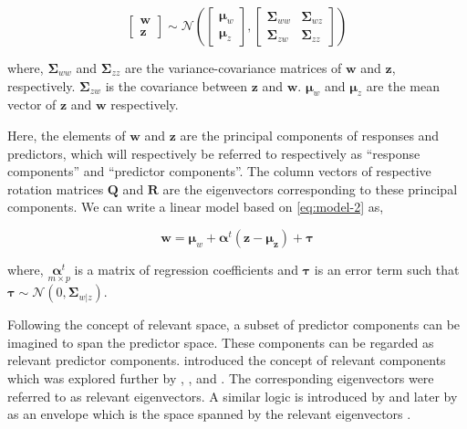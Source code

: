 \documentclass[review]{elsarticle}
\begin{document}
\begin{equation}
  \begin{bmatrix}
    \mathbf{w} \\ \mathbf{z}
  \end{bmatrix} \sim \mathcal{N}
  \left(
    \begin{bmatrix}
      \boldsymbol{\mu}_w \\
      \boldsymbol{\mu}_z
    \end{bmatrix},
    \begin{bmatrix}
    \boldsymbol{\Sigma}_{ww} & \boldsymbol{\Sigma}_{wz} \\
    \boldsymbol{\Sigma}_{zw} & \boldsymbol{\Sigma}_{zz}
    \end{bmatrix}
  \right)
  \label{eq:model-2}
\end{equation}

where, \(\boldsymbol{\Sigma}_{ww}\) and \(\boldsymbol{\Sigma}_{zz}\) are
the variance-covariance matrices of \(\mathbf{w}\) and \(\mathbf{z}\),
respectively. \(\boldsymbol{\Sigma}_{zw}\) is the covariance between
\(\mathbf{z}\) and \(\mathbf{w}\). \(\boldsymbol{\mu}_w\) and
\(\boldsymbol{\mu}_z\) are the mean vector of \(\mathbf{z}\) and
\(\mathbf{w}\) respectively.

Here, the elements of \(\mathbf{w}\) and \(\mathbf{z}\) are the
principal components of responses and predictors, which will
respectively be referred to respectively as ``response components'' and
``predictor components''. The column vectors of respective rotation
matrices \(\mathbf{Q}\) and \(\mathbf{R}\) are the eigenvectors
corresponding to these principal components. We can write a linear model
based on \eqref{eq:model-2} as,

\begin{equation}
\mathbf{w} = \boldsymbol{\mu}_w + \boldsymbol{\alpha}^t(\mathbf{z} - \boldsymbol{\mu_z}) + \boldsymbol{\tau}
\label{eq:reg-model-2}
\end{equation}

where, \(\underset{m\times p}{\boldsymbol{\alpha}^t}\) is a matrix of
regression coefficients and \(\boldsymbol{\tau}\) is an error term such
that
\(\boldsymbol{\tau} \sim \mathcal{N}(0, \boldsymbol{\Sigma}_{w|z})\).

Following the concept of relevant space, a subset of predictor
components can be imagined to span the predictor space. These components
can be regarded as relevant predictor components. \citet{Naes1985}
introduced the concept of relevant components which was explored further
by \citet{helland1990partial}, \citet{naes1993relevant},
\citet{Helland1994b} and \citet{Helland2000}. The corresponding
eigenvectors were referred to as relevant eigenvectors. A similar logic
is introduced by \citet{cook2010envelope} and later by
\citet{cook2013envelopes} as an envelope which is the space spanned by
the relevant eigenvectors \citep[pp.~101]{cook2018envelope}.
\end{document}
